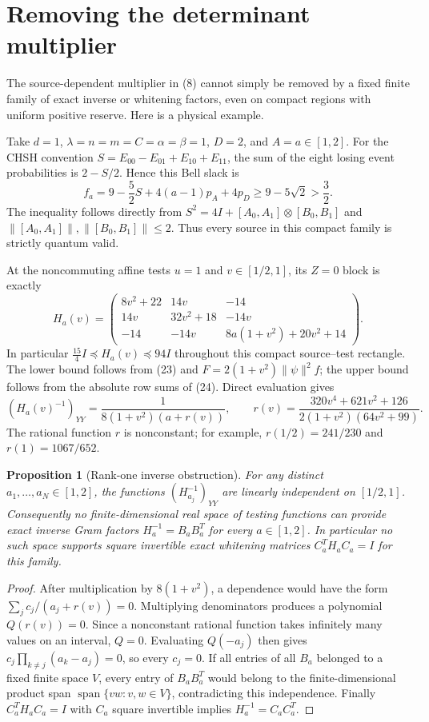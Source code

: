 \documentclass[11pt]{article}
\newtheorem{proposition}{Proposition}
\begin{document}
\section{Removing the determinant multiplier}

The source-dependent multiplier in (8) cannot simply be removed by a
fixed finite family of exact inverse or whitening factors, even on
compact regions with uniform positive reserve.  Here is a physical
example.

Take $d=1$, $\lambda=n=m=C=\alpha=\beta=1$, $D=2$, and $A=a\in[1,2]$.
For the CHSH convention $S=E_{00}-E_{01}+E_{10}+E_{11}$, the sum of the
eight losing event probabilities is $2-S/2$.  Hence this Bell slack is
\[
 f_a=9-\frac52S+4(a-1)p_A+4p_D
                    \geq9-5\sqrt2>\frac32.             \tag{23}
\]
The inequality follows directly from $S^2=4I+[A_0,A_1]\otimes[B_0,B_1]$
and $\|[A_0,A_1]\|,\|[B_0,B_1]\|\leq2$.
Thus every source in this compact family is strictly quantum valid.

At the noncommuting affine tests $u=1$ and $v\in[1/2,1]$, its $Z=0$
block is exactly
\[
 H_a(v)=\begin{pmatrix}
 8v^2+22&14v&-14\\
 14v&32v^2+18&-14v\\
 -14&-14v&8a(1+v^2)+20v^2+14
 \end{pmatrix}.                                           \tag{24}
\]
In particular $\frac{15}{4}I\preceq H_a(v)\preceq94I$ throughout this
compact source--test rectangle.  The lower bound follows from (23) and
$F=2(1+v^2)\|\psi\|^2f$; the upper bound follows from the absolute row
sums of (24).  Direct evaluation gives
\[
 (H_a(v)^{-1})_{YY}=
 \frac{1}{8(1+v^2)(a+r(v))},\qquad
 r(v)=\frac{320v^4+621v^2+126}{2(1+v^2)(64v^2+99)}.       \tag{25}
\]
The rational function $r$ is nonconstant; for example,
$r(1/2)=241/230$ and $r(1)=1067/652$.

\begin{proposition}[Rank-one inverse obstruction]
For any distinct $a_1,\ldots,a_N\in[1,2]$, the functions
$(H_{a_j}^{-1})_{YY}$ are linearly independent on $[1/2,1]$.
Consequently no finite-dimensional real space of testing functions
can provide exact inverse Gram factors $H_a^{-1}=B_aB_a^T$ for every
$a\in[1,2]$.  In particular no such space supports square invertible
exact whitening matrices $C_a^TH_aC_a=I$ for this family.
\end{proposition}

\begin{proof}
After multiplication by $8(1+v^2)$, a dependence would have the form
$\sum_jc_j/(a_j+r(v))=0$.  Multiplying denominators produces a
polynomial $Q(r(v))=0$.  Since a nonconstant rational function takes
infinitely many values on an interval, $Q=0$.  Evaluating $Q(-a_j)$
then gives $c_j\prod_{k\ne j}(a_k-a_j)=0$, so every $c_j=0$.
If all entries of all $B_a$ belonged to a fixed finite space $V$, every
entry of $B_aB_a^T$ would belong to the finite-dimensional product span
$\operatorname{span}\{vw:v,w\in V\}$, contradicting this independence.
Finally $C_a^TH_aC_a=I$ with $C_a$ square invertible implies
$H_a^{-1}=C_aC_a^T$.
\end{proof}
\end{document}
